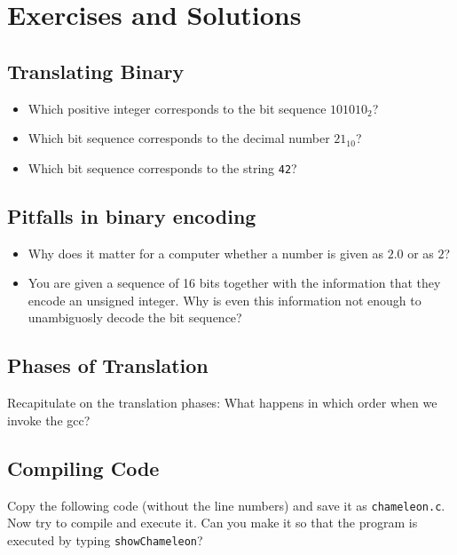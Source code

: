 \newpage
\section{Exercises and Solutions}
\subsection*{Translating Binary}
\begin{itemize}
\item Which positive integer corresponds to the bit sequence $101010_2$?
\item Which bit sequence corresponds to the decimal number $21_{10}$?
\item Which bit sequence corresponds to the string \texttt{42}?
\end{itemize}

\subsection*{Pitfalls in binary encoding}
\begin{itemize}
\item Why does it matter for a computer whether a number is given as $2.0$ or as $2$?
\item You are given a sequence of 16 bits together with the information that they encode an unsigned integer. Why is even this information not enough to unambiguosly decode the bit sequence?
\end{itemize}

\subsection*{Phases of Translation}
Recapitulate on the translation phases: What happens in which order when we invoke the gcc?

\subsection*{Compiling Code}
Copy the following code (without the line numbers) and save it as \texttt{chameleon.c}. Now try to compile and execute it. Can you make it so that the program is executed by typing \texttt{showChameleon}?

